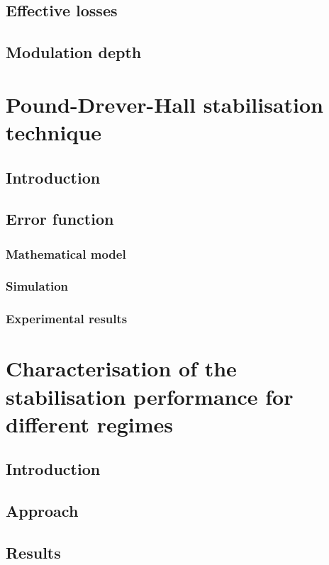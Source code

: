 
\subsection{Effective losses}


\subsection{Modulation depth}


\section{Pound-Drever-Hall stabilisation technique}


\subsection{Introduction}


\subsection{Error function}


\subsubsection{Mathematical model}


\subsubsection{Simulation}


\subsubsection{Experimental results}


\section{Characterisation of the stabilisation performance for different regimes}


\subsection{Introduction}


\subsection{Approach}


\subsection{Results}